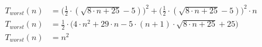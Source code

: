\begin{subequations}
\begin{align}
\label{eq:findlinesegments25}
T_{worst}(n)& = \bigl(\frac{1}{2} \cdot (\sqrt{8 \cdot n + 25} - 5)\bigr)^2 + \bigl(\frac{1}{2} \cdot
 (\sqrt{8 \cdot n + 25} - 5)\bigr)^2 \cdot n \\
\label{eq:findlinesegments26}
T_{worst}(n)& = \frac{1}{2} \cdot \bigl(4 \cdot n^2 + 29 \cdot n - 5 \cdot (n + 1) \cdot
 \sqrt{8 \cdot n + 25} + 25\bigr) \\
\label{eq:findlinesegments27}
T_{worst}(n)& = n^2
\end{align}
\end{subequations}
